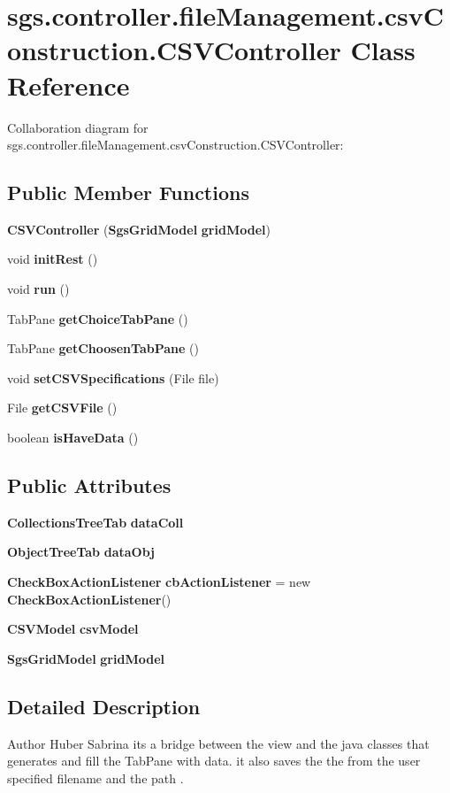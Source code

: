 \section{sgs.\-controller.\-file\-Management.\-csv\-Construction.\-C\-S\-V\-Controller Class Reference}
\label{classsgs_1_1controller_1_1file_management_1_1csv_construction_1_1_c_s_v_controller}


Collaboration diagram for sgs.\-controller.\-file\-Management.\-csv\-Construction.\-C\-S\-V\-Controller\-:
\subsection*{Public Member Functions}
\begin{DoxyCompactItemize}
\item 
{\bf C\-S\-V\-Controller} ({\bf Sgs\-Grid\-Model} {\bf grid\-Model})
\item 
void {\bf init\-Rest} ()
\item 
void {\bf run} ()
\item 
Tab\-Pane {\bf get\-Choice\-Tab\-Pane} ()
\item 
Tab\-Pane {\bf get\-Choosen\-Tab\-Pane} ()
\item 
void {\bf set\-C\-S\-V\-Specifications} (File file)
\item 
File {\bf get\-C\-S\-V\-File} ()
\item 
boolean {\bf is\-Have\-Data} ()
\end{DoxyCompactItemize}
\subsection*{Public Attributes}
\begin{DoxyCompactItemize}
\item 
{\bf Collections\-Tree\-Tab} {\bf data\-Coll}
\item 
{\bf Object\-Tree\-Tab} {\bf data\-Obj}
\item 
{\bf Check\-Box\-Action\-Listener} {\bf cb\-Action\-Listener} = new {\bf Check\-Box\-Action\-Listener}()
\item 
{\bf C\-S\-V\-Model} {\bf csv\-Model}
\item 
{\bf Sgs\-Grid\-Model} {\bf grid\-Model}
\end{DoxyCompactItemize}


\subsection{Detailed Description}
\begin{DoxyAuthor}{Author}
Huber Sabrina its a bridge between the view and the java classes that generates and fill the Tab\-Pane with data. it also saves the the from the user specified filename and the path . 
\end{DoxyAuthor}


